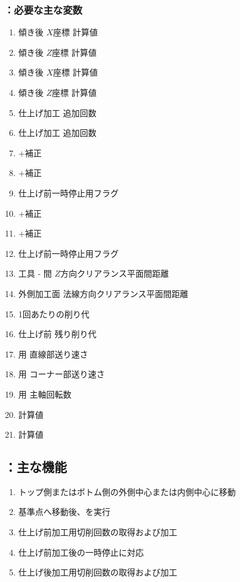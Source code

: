 \subsubsection{\KCurvedOutcutRLeft：必要な主な変数}
\begin{enumerate}[label*=\sarrow]
\item 傾き後 \TopSideCurvedOutcutCenter{} $X$座標{} 計算値
\item 傾き後 \TopSideCurvedOutcutCenter{} $Z$座標{} 計算値
\item 傾き後 \BottomSideCurvedOutcutCenter{} $X$座標{} 計算値
\item 傾き後 \BottomSideCurvedOutcutCenter{} $Z$座標{} 計算値
\item \TopOutcut{} 仕上げ加工 追加回数
\item \BottomOutcut{} 仕上げ加工 追加回数
\item \TopOutcutAsideThickness$+$補正
\item \TopOutcutWidth$+$補正
\item \TopOutcut{} 仕上げ前一時停止用フラグ
\item \BottomOutcutAsideThickness$+$補正
\item \BottomOutcutWidth$+$補正
\item \BottomOutcut{} 仕上げ前一時停止用フラグ
\item 工具 - \EndFace 間 $Z$方向クリアランス平面間距離
\item 外側加工面 法線方向クリアランス平面間距離
\item \OutcutMilling1回あたりの削り代
\item \OutcutMilling{} 仕上げ前 残り削り代
\item \OutcutMilling 用 直線部送り速さ
\item \OutcutMilling 用 コーナー部送り速さ
\item \OutcutMilling 用 主軸回転数
\item \TopCurvedOutcutAngle{} 計算値
\item \BottomCurvedOutcutAngle{} 計算値
\end{enumerate}


\subsection{\KCurvedOutcutRLeft：主な機能}
\begin{enumerate}[label*=\sarrow]
\item トップ側またはボトム側の外側中心または内側中心に移動
\item 基準点へ移動後、\KOLeftFSZ を実行
\item 仕上げ前加工用切削回数の取得および加工
\item 仕上げ前加工後の一時停止\OpauseCheck に対応
\item 仕上げ後加工用切削回数の取得および加工
\end{enumerate}


